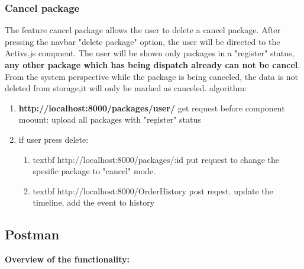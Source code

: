 \subsubsection{Cancel package}
The feature cancel package allows the user to delete a cancel package.
After pressing the navbar "delete package" option, the user will be directed to the Activs.js compnent.\newline
The user will be shown only packages in a "register" status, \textbf{any other package which has being dispatch already can not be cancel}.\newline
From the system perspective while the package is being canceled, the data is not deleted from storage,it will only be marked as canceled. algorithm:
\begin{enumerate}
  \item \textbf{http://localhost:8000/packages/user/}  get request before component moount: upload all packages with "register" status
  \item if user press delete:
  \begin{enumerate}
      \item textbf {http://localhost:8000/packages/:id}  put request to change the spesific package to "cancel" mode.
      \item textbf {http://localhost:8000/OrderHistory}  post reqest. update the timeline, add the event to history
\end{enumerate}
\end{enumerate}

\subsection{Postman}
\textbf{Overview of the functionality:}

